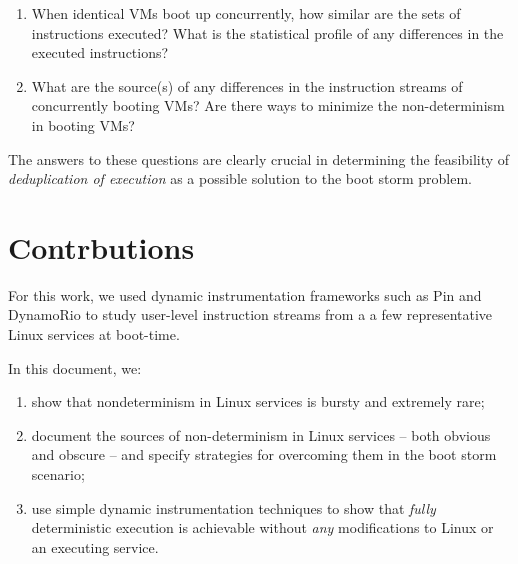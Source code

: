 \begin{enumerate}

\item When identical VMs boot up concurrently, how similar
are the sets of instructions executed? What is the statistical
profile of any differences in the executed instructions?

\item What are the source(s) of any differences in
the instruction streams of concurrently booting VMs?
Are there ways to minimize the non-determinism in
booting VMs?

\end{enumerate}

The answers to these questions are clearly crucial in determining
the feasibility of \emph{deduplication of execution} as a possible solution
to the boot storm problem. 

\section{Contrbutions}
For this work, we used dynamic instrumentation frameworks such as Pin \cite{luk2005pin} and
DynamoRio \cite{bruening2004dr} to study user-level instruction streams from a
a few representative Linux services at boot-time. \newline

In this document, we:
\begin {enumerate}
\item show that nondeterminism in Linux services is bursty and extremely rare;
\item document the sources of non-determinism in Linux services -- both obvious and obscure --
  and specify strategies for overcoming them in the boot storm scenario;
\item use simple dynamic instrumentation techniques to show that \emph{fully} deterministic execution is achievable
  without \emph{any} modifications to Linux or an executing service.
\end {enumerate}

